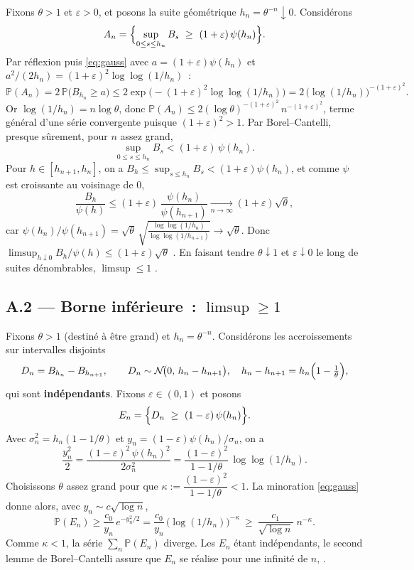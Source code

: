\documentclass[11pt,a4paper]{article}
\theoremstyle{plain}
\theoremstyle{definition}
\newcommand{\Prob}{\mathbb{P}}
\newcommand{\Loi}{\mathcal{N}}
\newcommand{\ps}{\text{p.s.}}
\begin{document}
Fixons $\theta>1$ et $\varepsilon>0$, et posons la suite g\'eom\'etrique $h_n=\theta^{-n}\downarrow 0$. Consid\'erons
\[
A_n=\Bigl\{\sup_{0\le s\le h_n}B_s\ \ge\ (1+\varepsilon)\,\psi(h_n)\Bigr\}.
\]
Par r\'eflexion puis \eqref{eq:gauss} avec $a=(1+\varepsilon)\psi(h_n)$ et $a^2/(2h_n)=(1+\varepsilon)^2\log\log(1/h_n)$~:
\[
\Prob(A_n)=2\,\Prob\!\bigl(B_{h_n}\ge a\bigr)\le 2\exp\!\bigl(-(1+\varepsilon)^2\log\log(1/h_n)\bigr)
=2\,\bigl(\log(1/h_n)\bigr)^{-(1+\varepsilon)^2}.
\]
Or $\log(1/h_n)=n\log\theta$, donc $\Prob(A_n)\le 2(\log\theta)^{-(1+\varepsilon)^2}\,n^{-(1+\varepsilon)^2}$, terme g\'en\'eral d'une s\'erie convergente puisque $(1+\varepsilon)^2>1$. Par Borel--Cantelli, presque s\^urement, pour $n$ assez grand,
\[
\sup_{0\le s\le h_n}B_s<(1+\varepsilon)\,\psi(h_n).
\]
Pour $h\in[h_{n+1},h_n]$, on a $B_h\le\sup_{s\le h_n}B_s<(1+\varepsilon)\psi(h_n)$, et comme $\psi$ est croissante au voisinage de $0$,
\[
\frac{B_h}{\psi(h)}\le(1+\varepsilon)\,\frac{\psi(h_n)}{\psi(h_{n+1})}\xrightarrow[n\to\infty]{}(1+\varepsilon)\sqrt{\theta},
\]
car $\psi(h_n)/\psi(h_{n+1})=\sqrt{\theta}\,\sqrt{\tfrac{\log\log(1/h_n)}{\log\log(1/h_{n+1})}}\to\sqrt\theta$. Donc $\limsup_{h\downarrow0}B_h/\psi(h)\le(1+\varepsilon)\sqrt\theta$ \ps. En faisant tendre $\theta\downarrow 1$ et $\varepsilon\downarrow 0$ le long de suites d\'enombrables, $\limsup\le 1$ \ps.

\subsection*{A.2 — Borne inf\'erieure~: $\limsup\ge 1$ \ps}

Fixons $\theta>1$ (destin\'e \`a \^etre grand) et $h_n=\theta^{-n}$. Consid\'erons les accroissements sur intervalles disjoints
\[
D_n=B_{h_n}-B_{h_{n+1}},\qquad D_n\sim\Loi\!\bigl(0,\,h_n-h_{n+1}\bigr),\quad h_n-h_{n+1}=h_n\Bigl(1-\tfrac1\theta\Bigr),
\]
qui sont \textbf{ind\'ependants}. Fixons $\varepsilon\in(0,1)$ et posons
\[
E_n=\Bigl\{D_n\ \ge\ (1-\varepsilon)\,\psi(h_n)\Bigr\}.
\]
Avec $\sigma_n^2=h_n(1-1/\theta)$ et $y_n=(1-\varepsilon)\psi(h_n)/\sigma_n$, on a
\[
\frac{y_n^2}{2}=\frac{(1-\varepsilon)^2\,\psi(h_n)^2}{2\sigma_n^2}
=\frac{(1-\varepsilon)^2}{1-1/\theta}\,\log\log(1/h_n).
\]
Choisissons $\theta$ assez grand pour que $\kappa:=\dfrac{(1-\varepsilon)^2}{1-1/\theta}<1$. La minoration \eqref{eq:gauss} donne alors, avec $y_n\sim c\sqrt{\log n}$,
\[
\Prob(E_n)\ge\frac{c_0}{y_n}\,e^{-y_n^2/2}
=\frac{c_0}{y_n}\,\bigl(\log(1/h_n)\bigr)^{-\kappa}
\ \ge\ \frac{c_1}{\sqrt{\log n}}\;n^{-\kappa}.
\]
Comme $\kappa<1$, la s\'erie $\sum_n\Prob(E_n)$ diverge. Les $E_n$ \'etant ind\'ependants, le second lemme de Borel--Cantelli assure que $E_n$ se r\'ealise pour une infinit\'e de $n$, \ps.
\end{document}
